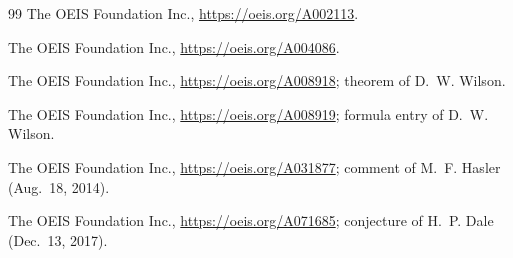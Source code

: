 \documentclass[11pt]{amsart}
\theoremstyle{plain}
\theoremstyle{definition}
\begin{document}
{\begin{thebibliography}{99}
The OEIS Foundation Inc., \url{https://oeis.org/A002113}.

The OEIS Foundation Inc., \url{https://oeis.org/A004086}.

The OEIS Foundation Inc., \url{https://oeis.org/A008918}; theorem of D.~W. Wilson.

The OEIS Foundation Inc., \url{https://oeis.org/A008919}; formula entry of D.~W. Wilson.

The OEIS Foundation Inc., \url{https://oeis.org/A031877}; comment of M.~F. Hasler (Aug.~18, 2014).

The OEIS Foundation Inc., \url{https://oeis.org/A071685}; conjecture of H.~P. Dale (Dec.~13, 2017).

\end{thebibliography}
}
\end{document}
